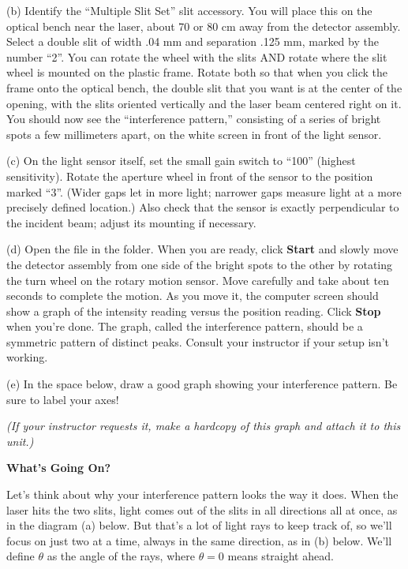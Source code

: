 
(b) Identify the ``Multiple Slit Set'' slit accessory.  You will place this on the optical bench near the laser, about 70 or 80 cm away from the detector assembly.  Select a double slit of width .04 mm and separation .125 mm, marked by the number ``2''. You can rotate the wheel with the slits AND rotate where the slit wheel is mounted on the plastic frame.  
Rotate both so that when you click the frame onto the optical bench, the double slit that you want is at the center of the opening, with the slits oriented vertically and the laser beam centered right on it.  You should now see the ``interference pattern,'' consisting of a series of bright spots a few millimeters apart, on the white screen in front of the light sensor.


(c) On the light sensor itself, set the small gain switch to ``100'' (highest sensitivity).  Rotate the aperture wheel in front of the sensor to the position marked ``3''.  (Wider gaps let in more light; narrower gaps measure light at a more precisely defined location.)  Also check that the sensor is exactly perpendicular to the incident beam; adjust its mounting if necessary.


(d) Open the file  in the \filename{\coursefolder} folder. 
When you are ready, click {\bf Start} and slowly move the detector assembly 
from one side of the bright spots to the other by rotating the turn wheel on the rotary 
motion sensor. Move carefully and take about ten seconds to complete the 
motion. 
As you move it, the computer screen should show a graph of the intensity reading versus the position reading. 
Click {\bf Stop} when you're done. 
The graph, called the interference pattern, should be a symmetric pattern of distinct peaks. Consult your instructor if your setup isn't working.

\pagebreak[2]
(e) In the space below, draw a good graph showing your interference pattern.  
Be sure to label your axes!
\answerspace{1.5in}

\textit{(If your instructor requests it, make a hardcopy of this graph and attach it to this unit.)}

\textbf{What's Going On?}

Let's think about why your interference pattern looks the way it does.  When the laser hits the two slits, 
light comes out of the slits in all directions all at once, as in the diagram (a) below.  
But that's a lot of light rays to keep track of, so we'll focus on just two at a time, always in the same direction, as in (b) below.
We'll define $\theta$ as the angle of the rays, where $\theta=0$ means straight ahead.  

